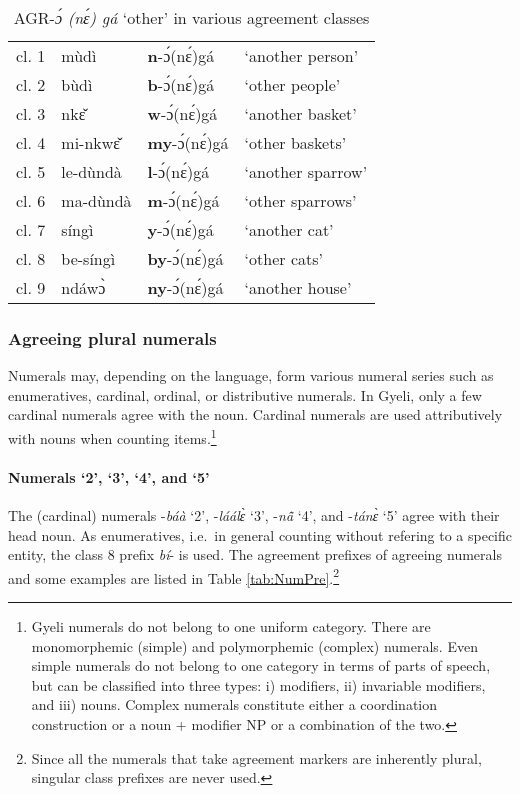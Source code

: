 \begin{table} 
\centering
\begin{tabular}{llll}
 \midrule
cl. 1 & mùdì & {\bfseries n}-ɔ́(nɛ́)gá & `another person' \\
cl. 2 & bùdì & {\bfseries b}-ɔ́(nɛ́)gá & `other people' \\
cl. 3 & nkɛ̌ & {\bfseries w}-ɔ́(nɛ́)gá & `another basket' \\
cl. 4 & mi-nkwɛ̌ & {\bfseries my}-ɔ́(nɛ́)gá & `other baskets' \\
cl. 5 & le-dùndà & {\bfseries l}-ɔ́(nɛ́)gá & `another sparrow' \\
cl. 6 & ma-dùndà & {\bfseries m}-ɔ́(nɛ́)gá & `other sparrows' \\
cl. 7 & síngì & {\bfseries y}-ɔ́(nɛ́)gá & `another cat' \\
cl. 8 & be-síngì & {\bfseries by}-ɔ́(nɛ́)gá & `other cats' \\
cl. 9 & ndáwɔ̀ & {\bfseries ny}-ɔ́(nɛ́)gá & `another house' \\
 \midrule
\end{tabular}
\caption{AGR-{\itshape ɔ́ (nɛ́) gá} `other' in various agreement classes}
\label{Tab:Other}
\end{table}






\subsubsection{Agreeing plural numerals} 
\label{sec:ModNUM}

Numerals may, depending on the language, form various numeral series such as enumeratives, cardinal, ordinal, or distributive numerals. In Gyeli, only a few cardinal numerals agree with the noun.
Cardinal numerals are used attributively with nouns when counting items.\footnote{Gyeli numerals do not belong to one uniform category. There are monomorphemic (simple) and polymorphemic (complex) numerals.  Even simple numerals do not belong to one category in terms of parts of speech, but can be classified into three types: i) modifiers, ii) invariable modifiers, and iii) nouns. Complex numerals constitute either a coordination construction or a noun + modifier NP or a combination of the two.}

\paragraph{Numerals `2', `3', `4', and `5'} 
The (cardinal) numerals -{\itshape báà} `2', -{\itshape láálɛ̀} `3', -{\itshape nã̂} `4', and -{\itshape tánɛ̀} `5' agree with their head noun. As enumeratives, i.e.\ in general counting without refering to a specific entity, the class 8 prefix {\itshape bí}- is used. The agreement prefixes of agreeing numerals and some examples are listed in Table \ref{tab:NumPre}.\footnote{Since all the numerals that take agreement markers are inherently plural, singular class prefixes are never used.} 

